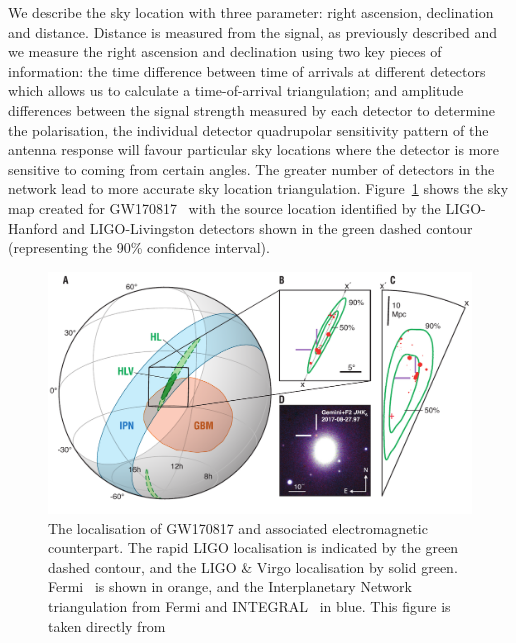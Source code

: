We describe the sky location with three parameter: right ascension, declination and distance. Distance is measured from the \gwadj signal, as previously described and we  measure the right ascension and declination using two key pieces of information: the time difference between time of arrivals at different detectors which allows us to calculate a time-of-arrival triangulation; and amplitude differences between the signal strength measured by each detector to determine the \gwadj polarisation, the individual detector quadrupolar sensitivity pattern of the antenna response will favour particular sky locations where the detector is more sensitive to \gws coming from certain angles. The greater number of \gwadj detectors in the network lead to more accurate sky location triangulation. Figure~\ref{6:fig:gw170817_skymap} shows the sky map created for GW170817~\cite{gw170817_skymap:2017} with the source location identified by the LIGO-Hanford and LIGO-Livingston detectors shown in the green dashed contour (representing the 90\% confidence interval).
%
\begin{figure}
    \centering
    \includegraphics[width=1.0\linewidth]{images/6_earlywarning/gw170817/GW170817_skymap.pdf}
    \caption{The localisation of GW170817 and associated electromagnetic counterpart. The rapid LIGO localisation is indicated by the green dashed contour, and the LIGO \& Virgo localisation by solid green. Fermi~\cite{Fermi:2022} is shown in orange, and the Interplanetary Network triangulation from Fermi and INTEGRAL~\cite{INTEGRAL:2003} in blue. This figure is taken directly from~\cite{gw170817_skymap:2017}}
    \label{6:fig:gw170817_skymap}
\end{figure}
%

